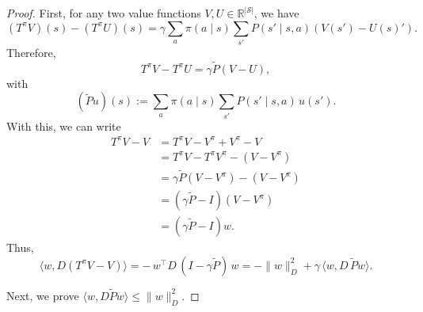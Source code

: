 \documentclass[
]{book}
\theoremstyle{definition}
\theoremstyle{definition}
\theoremstyle{definition}
\theoremstyle{definition}
\theoremstyle{remark}
\begin{document}
\begin{proof}
First, for any two value functions \(V, U \in \mathbb{R}^{|\mathcal{S}|}\), we have
\[
(T^\pi V)(s) - (T^\pi U)(s) = \gamma \sum_{a} \pi(a \mid s) \sum_{s'} P(s' \mid s,a) (V(s') - U(s)').
\]
Therefore,
\[
T^\pi V - T^\pi U = \gamma \widetilde P (V - U),
\]
with
\begin{equation}
(\widetilde P u)(s):=\sum_a\pi(a\mid s)\sum_{s'}P(s'\mid s,a)\,u(s').
\label{eq:def-tilde-P}
\end{equation}
With this, we can write
\begin{equation}
\begin{split}
T^\pi V - V & = T^\pi V - V^\pi + V^\pi - V \\
& = T^\pi V - T^\pi V^\pi - ( V - V^\pi ) \\
& = \gamma \widetilde P (V - V^\pi) - ( V - V^\pi ) \\
& = (\gamma \widetilde P - I) ( V - V^\pi ) \\
& = (\gamma \widetilde P - I) w.
\end{split}
\end{equation}
Thus,
\begin{equation}
\langle w, D(T^\pi V - V)\rangle
= -\,w^\top D\,(I-\gamma \widetilde P)\,w
= -\|w\|_D^2 + \gamma\,\langle w, D\,\widetilde P w\rangle.
\label{eq:InnerProductInequality}
\end{equation}

Next, we prove \(\langle w, D\widetilde P w\rangle\le \|w\|_D^2\).


\end{proof}
\end{document}
